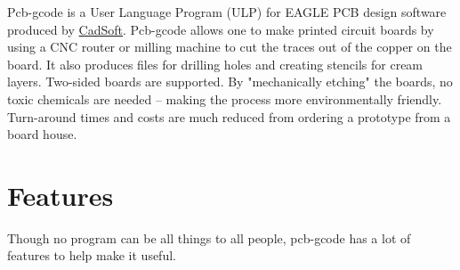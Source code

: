 \documentclass[11pt]{book}
\begin{document}
Pcb-gcode is a User Language Program (ULP) for EAGLE PCB design software produced by \href{http://cadsoftusa.com}{CadSoft}. Pcb-gcode allows one to make printed circuit boards by using a CNC router or milling machine to cut the traces out of the copper on the board. It also produces files for drilling holes and creating stencils for cream layers. Two-sided boards are supported. By "mechanically etching" the boards, no toxic chemicals are needed -- making the process more environmentally friendly. Turn-around times and costs are much reduced from ordering a prototype from a board house.

%
%
\section{Features}\label{sec:Features}

Though no program can be all things to all people, pcb-gcode has a lot of features to help make it useful.
\end{document}
